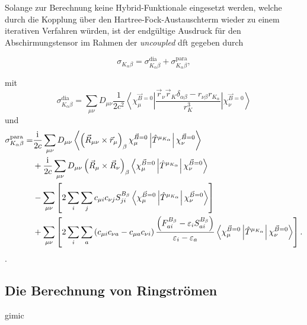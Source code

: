 Solange zur Berechnung keine Hybrid-Funktionale eingesetzt werden, welche durch die Kopplung über den Hartree-Fock-Austauschterm wieder zu einem iterativen Verfahren würden, ist  der endgültige Ausdruck für den Abschirmungstensor im Rahmen der \textit{uncoupled} \ac{dft} gegeben durch

\begin{equation}
\sigma_{K_\alpha\beta}=\sigma_{K_\alpha\beta}^{\textrm{dia}}+\sigma_{K_\alpha\beta}^{\textrm{para}},
\end{equation}

mit 
\begin{equation}
\sigma_{K_\alpha\beta}^{\textrm{dia}}=\sum_{\mu\nu}D_{\mu\nu}\frac{1}{2c^2}\left.\left\langle\chi_\mu^{\vec{B}=0}\right\vert\frac{\vec{r}_\nu\vec{r}_K\delta_{\alpha\beta}-r_{\nu \beta}r_{K_\alpha}}{r_K^3}\left\vert\chi_\nu^{\vec{B}=0}\right\rangle\right.
\end{equation}
und
\begin{equation}
\begin{aligned}
\sigma_{K_\alpha\beta}^{\textrm{para}}=&\frac{\mathrm{i}\mkern1mu}{2c}\sum_{\mu\nu}D_{\mu\nu}\left\langle\left(\vec{R}_{\mu\nu}\times\vec{r}_\mu\right)_\beta\chi_\mu^{\vec{B}=0}\left\vert\hat{T}^{\mu_{K_\alpha}}\right\vert\chi_\nu^{\vec{B}=0}\right\rangle\\
&+\frac{\mathrm{i}\mkern1mu}{2c}\sum_{\mu\nu}D_{\mu\nu}\left(\vec{R}_{\mu}\times\vec{R}_\nu\right)_\beta\left\langle\chi_\mu^{\vec{B}=0}\left\vert\hat{T}^{\mu_{K_\alpha}}\right\vert\chi_\nu^{\vec{B}=0}\right\rangle\\
&-\sum_{\mu\nu}\left[2\sum_i\sum_j c_{\mu i}c_{\nu j} S_{ji}^{B_\beta}\left\langle\chi_\mu^{\vec{B}=0}\left\vert\hat{T}^{\mu_{K_\alpha}}\right\vert\chi_\nu^{\vec{B}=0}\right\rangle\right]\\
&+\sum_{\mu\nu}\left[2\sum_i\sum_a\left(c_{\mu i}c_{\nu a}-c_{\mu a}c_{\nu i}\right)\frac{\left(F_{ai}^{B_\beta}-\varepsilon_i S_{ai}^{B_\beta}\right)}{\varepsilon_i-\varepsilon_a}\left\langle\chi_\mu^{\vec{B}=0}\left\vert\hat{T}^{\mu_{K_\alpha}}\right\vert\chi_\nu^{\vec{B}=0}\right\rangle\right].
\end{aligned}
\end{equation}
.

\subsection{Die Berechnung von Ringströmen}
\ac{gimic}\supercite{juselius2004calculation,taubert2011calculation,fliegl2011gauge,sundholm2016calculations}